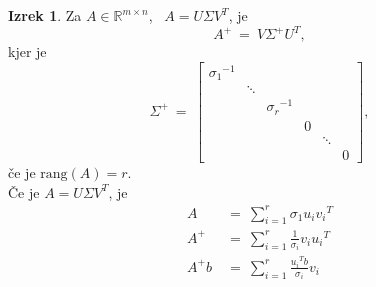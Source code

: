 \documentclass[11pt]{article}
\theoremstyle{definition}
\newtheorem{izrek}{Izrek}
\begin{document}
\begin{izrek}

Za $A \in \mathbb{R}^{m \times n}$, ~$A = U \Sigma V^T$, je
$$A^+ ~=~ V \Sigma^+ U^T,$$
kjer je
$$\Sigma^+ ~=~ \begin{bmatrix}
{\sigma_1}^{-1} & ~ & ~ & ~ & ~ & ~ \\
~ & \ddots & ~ & ~ & ~ & ~ \\
~ & ~ & {\sigma_r}^{-1} & ~ & ~ & ~ \\
~ & ~ & ~ & 0 & ~ & ~ \\
~ & ~ & ~ & ~ & \ddots & \\
~ & ~ & ~ & ~ & ~ & 0
\end{bmatrix},$$
če je $\text{rang}(A) = r$. \\

\noindent Če je $A = U \Sigma V^T$, je 
\begin{align*}
A ~&=~ \sum_{i=1}^r \sigma_1 u_i {v_i}^T \\ 
A^+ ~&=~ \sum_{i=1}^r \frac{1}{\sigma_i} v_i {u_i}^T \\
A^+ b ~&=~ \sum_{i=1}^r \frac{{u_i}^T b}{\sigma_i} v_i
\end{align*}

\end{izrek}
\vspace{0.5cm}


\pagebreak

\end{document}
